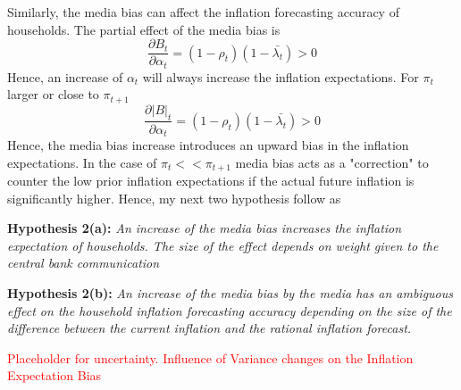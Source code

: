 \documentclass[review]{elsarticle}
\begin{document}
Similarly, the media bias can affect the inflation forecasting accuracy of households. The partial effect of the media bias is
\begin{equation}
\frac{\partial B_t}{\partial \alpha_t} = (1-\rho_t) (1-\bar{\lambda_t}) > 0 
\end{equation}
Hence, an increase of $\alpha_t$ will always increase the inflation expectations. For $\pi_t$ larger or close to $\pi_{t+1}$ 
\begin{equation}
\frac{\partial |B|_t}{\partial \alpha_t} = (1-\rho_t) (1-\bar{\lambda_t}) > 0 
\end{equation}
Hence, the media bias increase introduces an upward bias in the inflation expectations. In the case of $\pi_t << \pi_{t+1}$ media bias acts as a "correction" to counter the low prior inflation expectations if the actual future inflation is significantly higher. Hence, my next two hypothesis follow as
\\
\par
\textbf{Hypothesis 2(a):} \textit{An increase of the media bias increases the inflation expectation of households. The size of the effect depends on weight given to the central bank communication \\}
\par
\par
\textbf{Hypothesis 2(b):} \textit{An increase of the media bias by the media has an ambiguous effect on the household inflation forecasting accuracy depending on the size of the difference between the current inflation and the rational inflation forecast.\\}
\par
\textcolor{red}{Placeholder for uncertainty. Influence of Variance changes on the Inflation Expectation Bias}
\end{document}
